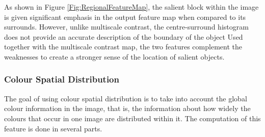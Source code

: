 \documentclass[10pt,twocolumn,letterpaper]{article}
\begin{document}
As shown in Figure \ref{Fig:RegionalFeatureMap}, the salient block within the image is given significant emphasis in the output feature map when compared to its surrounds.  However, unlike multiscale contrast, the centre-surround histogram does not provide an accurate description of the boundary of the object Used together with the multiscale contrast map, the two features complement the weaknesses to create a stronger sense of the location of salient objects.

\subsubsection{Colour Spatial Distribution}

The goal of using colour spatial distribution is to take into account the global colour information in the image, that is, the information about how widely the colours that occur in one image are distributed within it.  The computation of this feature is done in several parts.
\end{document}
